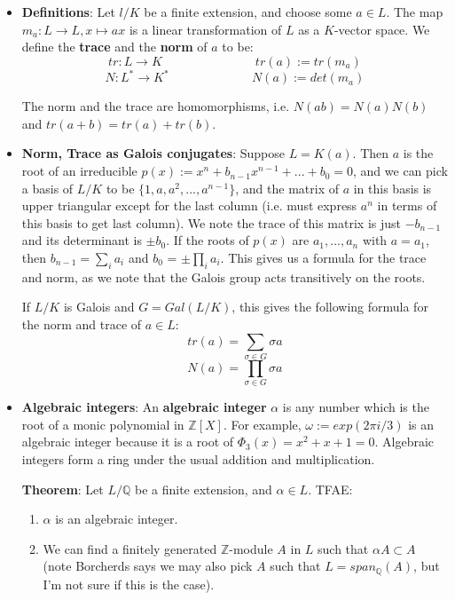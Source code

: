 \documentclass[11pt, oneside]{amsart}   	%
\theoremstyle{definition}
\begin{document}
\begin{itemize}

	\item \textbf{Definitions}: Let $l / K$ be a finite extension, and choose some $a\in L$. The map $m_a: L\rightarrow L, x\mapsto ax$ is a linear 
	transformation of $L$ as a $K$-vector space. We define the \textbf{trace} and the \textbf{norm} of $a$ to be:
	$$
		tr : L\rightarrow K \;\;\;\;\;\;\;\;\;\;\;\;\;\;\;\;\;\;\;\;\;\;\;\;\;\;\;tr(a) := tr(m_a)
	$$
	$$
		N : L^*\rightarrow K^*\;\;\;\;\;\;\;\;\;\;\;\;\;\;\;\;\;\;\;\;\;\;\;\; N(a) := det(m_a)
	$$
	
	The norm and the trace are homomorphisms, i.e. $N(ab) = N(a)N(b)$ and $tr(a + b) = tr(a) + tr(b)$. 
	
	\item \textbf{Norm, Trace as Galois conjugates}: Suppose $L = K(a)$. Then $a$ is the root of an irreducible $p(x) := x^n + b_{n - 1}x^{n - 1} + ...+ b_0 = 
	0$, and we can pick a basis of $L / K$ to be $\{1, a, a^2, ..., a^{n - 1}\}$, and the matrix of $a$ in this basis is upper triangular except for the last column 
	(i.e. must express $a^n$ in terms of this basis to get last column). We note the trace of this matrix is just $-b_{n - 1}$ and its determinant is $\pm b_0$. 
	If the roots of $p(x)$ are $a_1, ..., a_n$ with $a = a_1$, then $b_{n - 1} = \sum_i a_i$ and $b_0$ = $\pm\prod_i a_i$. This gives us a formula for the 
	trace and norm, as we note that the Galois group acts transitively on the roots.
	
	If $L / K$ is Galois and $G = Gal(L / K)$, this gives the following formula for the norm and trace of $a\in L$:
	$$
		tr(a) = \sum_{\sigma\in G}\sigma a
	$$
	$$
		N(a) = \prod_{\sigma\in G}\sigma a
	$$
	
	\item \textbf{Algebraic integers}: An \textbf{algebraic integer} $\alpha$ is any number which is the root of a monic polynomial in $\mathbb Z[X]$. For 
	example, $\omega := exp(2\pi i / 3)$ is an algebraic integer because it is a root of $\Phi_3(x) = x^2 + x + 1 = 0$. Algebraic integers form a ring under 
	the usual addition and multiplication.
	
	\textbf{Theorem}: Let $L / \mathbb Q$ be a finite extension, and $\alpha\in L$. TFAE:
	\begin{enumerate}
		\item $\alpha$ is an algebraic integer.
		\item We can find a finitely generated $\mathbb Z$-module $A$ in $L$ such that $\alpha A\subset A$ (note Borcherds says we may also pick $A$ 
		such that $L = span_\mathbb{Q}(A)$, but I'm not sure if this is the case).
	\end{enumerate}
	

\end{itemize}
\end{document}
